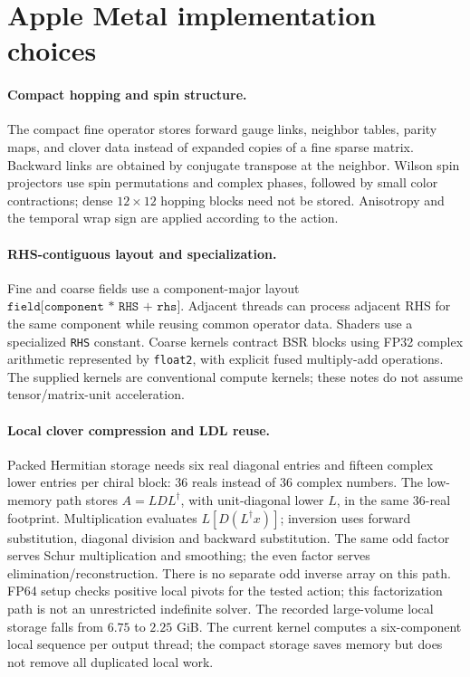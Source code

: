 \documentclass[11pt]{article}
\newcommand{\adj}{^{\dagger}}
\newcommand{\file}[1]{\nolinkurl{#1}}
\begin{document}
\section{Apple Metal implementation choices}
\paragraph{Compact hopping and spin structure.}
The compact fine operator stores forward gauge links, neighbor tables, parity
maps, and clover data instead of expanded copies of a fine sparse matrix.
Backward links are obtained by conjugate transpose at the neighbor. Wilson
spin projectors use spin permutations and complex phases, followed by small
color contractions; dense $12\times12$ hopping blocks need not be stored.
Anisotropy and the temporal wrap sign are applied according to the action.

\paragraph{RHS-contiguous layout and specialization.}
Fine and coarse fields use a component-major layout
$\texttt{field[component * RHS + rhs]}$. Adjacent threads can process adjacent
RHS for the same component while reusing common operator data. Shaders use a
specialized \file{RHS} constant. Coarse kernels contract BSR blocks using
FP32 complex arithmetic represented by \file{float2}, with explicit fused
multiply-add operations. The supplied kernels are conventional compute
kernels; these notes do not assume tensor/matrix-unit acceleration.

\paragraph{Local clover compression and LDL reuse.}
Packed Hermitian storage needs six real diagonal entries and fifteen complex
lower entries per chiral block: 36 reals instead of 36 complex numbers.
The low-memory path stores $A=LDL\adj$, with unit-diagonal lower $L$, in the
same 36-real footprint. Multiplication evaluates $L[D(L\adj x)]$; inversion
uses forward substitution, diagonal division and backward substitution.
The same odd factor serves Schur multiplication and smoothing; the even
factor serves elimination/reconstruction. There is no separate odd inverse
array on this path. FP64 setup checks positive local pivots for the tested
action; this factorization path is not an unrestricted indefinite solver.
The recorded large-volume local storage falls from $6.75$ to $2.25$ GiB.
The current kernel computes a six-component local sequence per output thread;
the compact storage saves memory but does not remove all duplicated local work.
\end{document}
